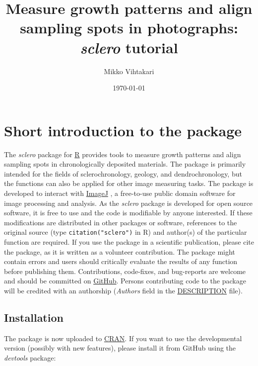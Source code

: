 \documentclass[11pt, a4paper]{article}
\title{Measure growth patterns and align sampling spots in photographs: \textit{sclero} tutorial}
\newcommand{\sclero}{\textit{sclero}\xspace}
\begin{document}
\author{Mikko Vihtakari}
\date{\today}
\maketitle

\tableofcontents




\reversemarginpar

\newpage

\section{Short introduction to the package}

The \sclero package for \href{http://www.r-project.org}{R} \citep{R2014} provides tools to measure growth patterns and align sampling spots in chronologically deposited materials. The package is primarily intended for the fields of sclerochronology, geology, and dendrochronology, but the functions can also be applied for other image measuring tasks. The package is developed to interact with \href{http://imagej.nih.gov/ij/}{ImageJ} \citep{Schneider2012}, a free-to-use public domain software for image processing and analysis. As the \sclero package is developed for open source software, it is free to use and the code is modifiable by anyone interested. If these modifications are distributed in other packages or software, references to the original source (type \texttt{citation("sclero")} in R) and author(s) of the particular function are required. If you use the package in a scientific publication, please cite the package, as it is written as a volunteer contribution. The package might contain errors and users should critically evaluate the results of any function before publishing them. Contributions, code-fixes, and bug-reports are welcome and should be committed on \href{https://github.com/MikkoVihtakari/sclero}{GitHub}. Persons contributing code to the package will be credited with an authorship (\textit{Authors} field in the \href{https://github.com/MikkoVihtakari/sclero/blob/master/DESCRIPTION}{DESCRIPTION} file).

\subsection{Installation}

The package is now uploaded to \href{https://cran.r-project.org/package=sclero}{CRAN}. If you want to use the developmental version (possibly with new features), please install it from GitHub using the \textit{devtools} package: 
\end{document}
